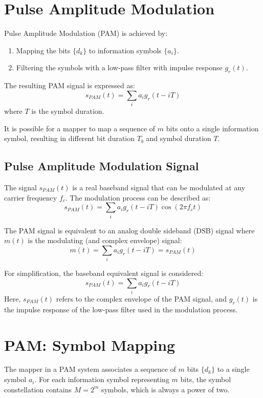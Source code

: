 \section*{Pulse Amplitude Modulation}

Pulse Amplitude Modulation (PAM) is achieved by:
\begin{enumerate}
    \item Mapping the bits \( \{d_k\} \) to information symbols \( \{a_i\} \).
    \item Filtering the symbols with a low-pass filter with impulse response \( g_r(t) \).
\end{enumerate}
The resulting PAM signal is expressed as:
\[ s_{PAM}(t) = \sum_i a_i g_r(t - iT) \]
where \( T \) is the symbol duration.

It is possible for a mapper to map a sequence of \( m \) bits onto a single information symbol, resulting in different bit duration \( T_b \) and symbol duration \( T \).

\subsection*{Pulse Amplitude Modulation Signal}

The signal \( s_{PAM}(t) \) is a real baseband signal that can be modulated at any carrier frequency \( f_c \). The modulation process can be described as:
\[ s_{PAM}(t) = \sum_i a_i g_r(t - iT) \cos(2\pi f_c t) \]

The PAM signal is equivalent to an analog double sideband (DSB) signal where \( m(t) \) is the modulating (and complex envelope) signal:
\[ m(t) = \sum_i a_i g_r(t - iT) = s_{PAM}(t) \]

For simplification, the baseband equivalent signal is considered:
\[ s_{PAM}(t) = \sum_i a_i g_r(t - iT) \]
Here, \( s_{PAM}(t) \) refers to the complex envelope of the PAM signal, and \( g_r(t) \) is the impulse response of the low-pass filter used in the modulation process.

\section*{PAM: Symbol Mapping}

The mapper in a PAM system associates a sequence of \( m \) bits \( \{d_k\} \) to a single symbol \( a_i \). For each information symbol representing \( m \) bits, the symbol constellation contains \( M = 2^m \) symbols, which is always a power of two.

